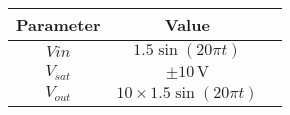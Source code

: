 \begin{tabular}{|c|c|c|}
    \hline
    \textbf{Parameter} & \textbf{Value} \\
    \hline
    $Vin$ & $1.5 \sin(20\pi t)$ \\
    \hline
    $V_{sat}$ & $\pm 10 \, \text{V}$ \\
    \hline
    $V_{out}$ & $10 \times 1.5 \sin(20\pi t)$ \\
    \hline
\end{tabular}


